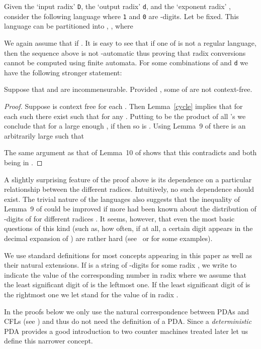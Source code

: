 \documentclass[12pt]{article}
\begin{document}
Given the `input radix' {\tt D}, the `output radix' {\tt d}, and the
`exponent radix' , consider the following language  where {\tt 1} and {\tt 0} are
-digits.
Let  be fixed.
This language can be partitioned into ,
, where 

We again assume that  if .
It is easy to see that if
one of  is not a regular language,
then the sequence 
above is not -automatic thus proving that radix
conversions cannot be computed using finite automata. For some
combinations of  and {\tt d} we have the following stronger statement:
\begin{lemma}\label{cling}
Suppose that  and  are incommensurable.
Provided , some of  are not context-free.
\end{lemma}
\begin{proof}Suppose  is context free for each
.
Then Lemma~\ref{cycle} implies that for
each such  there
exist  such that for any  . Putting  to be the product of all 's
  we conclude that for a large enough , if 
  then so is . Using Lemma~9 of \cite{Clinger} there
  is an arbitrarily large  such that

The same argument as that of Lemma~10 of \cite{Clinger} shows that
this contradicts  and  both being
in .
\end{proof}

A slightly surprising feature of the proof above is its dependence on
a particular relationship between the different 
radices. Intuitively, no such dependence should exist. The
trivial nature of the languages  also suggests that the
inequality of Lemma~9 of \cite{Clinger} could be improved if more had been
known about the distribution of -digits of  for
different radices . It seems, however, that even the most basic
questions of this kind (such as, how often, if at all, a certain
digit appears in the decimal expansion of ) are rather
hard (see~\cite{Allouche} or \cite{Hardy} for some examples).

We use standard definitions for most concepts appearing in this paper
as well as their natural extensions. If
 is a string of -digits for some radix , we write
 to indicate the value of the corresponding
number in radix  where we assume that the least significant
digit of  is the leftmost one. If the least significant digit of 
is the rightmost one we let  stand for the value
of  in radix .

In the proofs below we only use the natural correspondence between
PDAs and CFLs (see \cite{hum}) and thus do not need the definition of
a PDA. Since  a {\it deterministic\/} PDA provides a good introduction
to two counter machines treated later let us define this narrower
concept.
\end{document}
